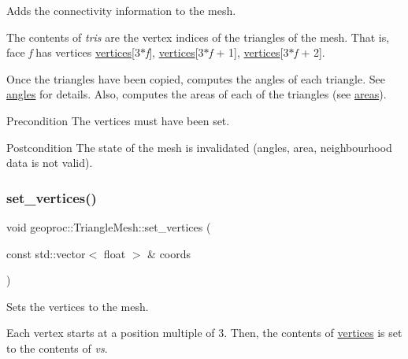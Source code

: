 Adds the connectivity information to the mesh. 

The contents of {\itshape tris} are the vertex indices of the triangles of the mesh. That is, face {\itshape f} has vertices \hyperlink{classgeoproc_1_1TriangleMesh_a82c3351de37daa9440f53597f080992d}{vertices}\mbox{[}3$\ast${\itshape f}\mbox{]}, \hyperlink{classgeoproc_1_1TriangleMesh_a82c3351de37daa9440f53597f080992d}{vertices}\mbox{[}3$\ast${\itshape f} + 1\mbox{]}, \hyperlink{classgeoproc_1_1TriangleMesh_a82c3351de37daa9440f53597f080992d}{vertices}\mbox{[}3$\ast${\itshape f} + 2\mbox{]}.

Once the triangles have been copied, computes the angles of each triangle. See \hyperlink{classgeoproc_1_1TriangleMesh_ab255af87d20d76ad84246560fa3579b3}{angles} for details. Also, computes the areas of each of the triangles (see \hyperlink{classgeoproc_1_1TriangleMesh_a684ecaaa03f1739856bba03167e51dd1}{areas}).

\begin{DoxyPrecond}{Precondition}
The vertices must have been set. 
\end{DoxyPrecond}
\begin{DoxyPostcond}{Postcondition}
The state of the mesh is invalidated (angles, area, neighbourhood data is not valid). 
\end{DoxyPostcond}
\mbox{\label{classgeoproc_1_1TriangleMesh_aa9ca26f1ededecd289d1a8800dca2c23}} 
\subsubsection{\texorpdfstring{set\+\_\+vertices()}{set\_vertices()}\hspace{0.1cm}{\footnotesize\ttfamily [1/3]}}
{\footnotesize\ttfamily void geoproc\+::\+Triangle\+Mesh\+::set\+\_\+vertices (\begin{DoxyParamCaption}\item[{const std\+::vector$<$ float $>$ \&}]{coords }\end{DoxyParamCaption})}



Sets the vertices to the mesh. 

Each vertex starts at a position multiple of 3. Then, the contents of \hyperlink{classgeoproc_1_1TriangleMesh_a82c3351de37daa9440f53597f080992d}{vertices} is set to the contents of {\itshape vs}.

